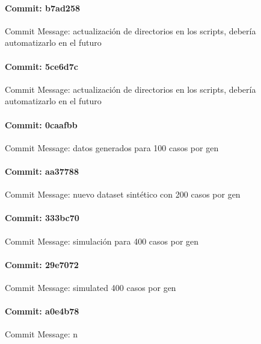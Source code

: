 \documentclass{article}
\begin{document}
\paragraph{Commit: b7ad258}
Commit Message: actualización de directorios en los scripts, debería automatizarlo en el futuro

\paragraph{Commit: 5ce6d7c}
Commit Message: actualización de directorios en los scripts, debería automatizarlo en el futuro

\paragraph{Commit: 0caafbb}
Commit Message: datos generados para 100 casos por gen

\paragraph{Commit: aa37788}
Commit Message: nuevo dataset sintético con 200 casos por gen

\paragraph{Commit: 333bc70}
Commit Message: simulación para 400 casos por gen

\paragraph{Commit: 29e7072}
Commit Message: simulated 400 casos por gen

\paragraph{Commit: a0e4b78}
Commit Message: n

\end{document}

